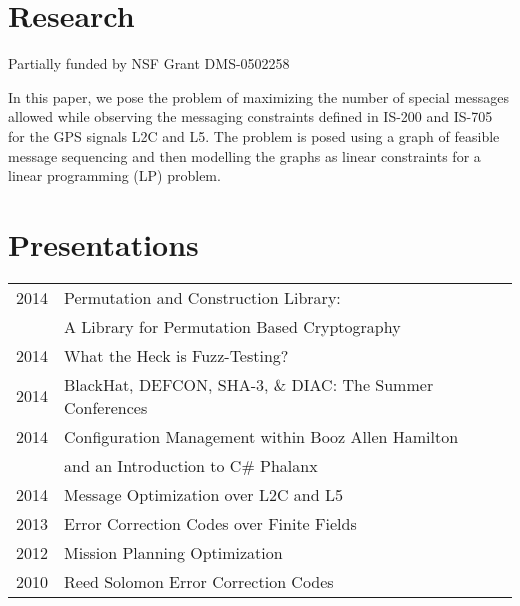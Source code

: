 \documentclass{deedy-resume} %
\begin{document}
\begin{minipage}[t]{0.66\textwidth}
\section{Research}


Partially funded by NSF Grant DMS-0502258

\sectionspace %



In this paper, we pose the problem of maximizing the number of special messages allowed while observing the messaging constraints defined in IS-200 and IS-705 for the GPS signals L2C and L5.  The problem is posed using a graph of feasible message sequencing and then modelling the graphs as linear constraints for a linear programming (LP) problem.
\sectionspace %


\section{Presentations} 

\begin{tabular}{rll}
2014     & Permutation and Construction Library: \\
		 &A Library for Permutation Based Cryptography\\
2014	 & What the Heck is Fuzz-Testing?\\
2014	 & BlackHat, DEFCON, SHA-3, \& DIAC: The Summer Conferences\\
2014	 & Configuration Management within Booz Allen Hamilton \\
		 & and an Introduction to C\# Phalanx\\
2014  	 & Message Optimization over L2C and L5\\
2013 	 & Error Correction Codes over Finite Fields \\
2012 	 & Mission Planning Optimization \\
2010 	 & Reed Solomon Error Correction Codes\\
\end{tabular}


\end{minipage}
\end{document}
